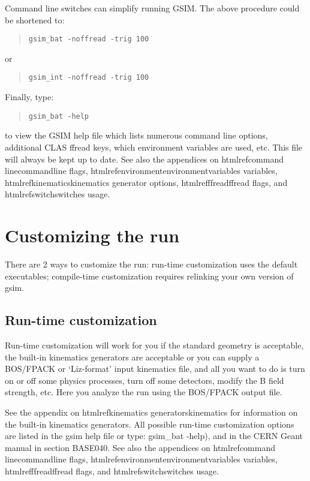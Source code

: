 \documentclass{article}
\begin{document}
Command line switches can simplify running GSIM.  The above procedure
could be shortened to:
\begin{quote}
{\tt gsim\_bat -noffread -trig 100 }
\end{quote}
or
\begin{quote}
{\tt gsim\_int -noffread -trig 100}
\end{quote}
Finally, type:
\begin{quote}
{\tt gsim\_bat -help}
\end{quote}
to view the GSIM help file
which lists
numerous command line options, additional CLAS ffread keys, which
environment variables are used, etc.  This file will always be kept up
to date.  See also the appendices on
htmlref{command line}{commandline} flags,
htmlref{environment}{environmentvariables} variables,
htmlref{kinematics}{kinematics} generator options,
htmlref{ffread}{ffread} flags, and
htmlref{switch}{switches} usage.


\section{Customizing the run}
\label{customizing}

There are 2 ways to customize the run: run-time customization uses the
default executables; compile-time customization requires relinking your
own version of gsim.

\subsection{Run-time customization}
\label{runtime}

Run-time customization will work for you if the standard geometry is
acceptable, the built-in kinematics generators are acceptable or you
can supply a BOS/FPACK or `Liz-format' input kinematics file, and all
you want to do is turn on or off some physics processes, turn off some
detectors, modify the B field strength, etc.  Here you analyze the run
using the BOS/FPACK output file.

See the appendix on htmlref{kinematics generators}{kinematics} for
information on the built-in kinematics generators.  All possible
run-time customization options are listed in the gsim help file
or type: gsim\_bat -help), and in the CERN Geant
manual in section BASE040.  See also the appendices on
htmlref{command line}{commandline} flags,
htmlref{environment}{environmentvariables} variables,
htmlref{ffread}{ffread} flags, and
htmlref{switch}{switches} usage.
\end{document}
